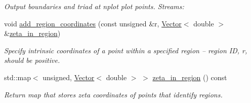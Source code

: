 \begin{DoxyCompactItemize}
\begin{DoxyCompactList}\small\item\em Output boundaries and triad at nplot plot points. Streams\+: \end{DoxyCompactList}\item 
void \hyperlink{classoomph_1_1DiskLikeGeomObjectWithBoundaries_a09b4f5e8e2a47cfb5159d4656e440359}{add\+\_\+region\+\_\+coordinates} (const unsigned \&r, \hyperlink{classoomph_1_1Vector}{Vector}$<$ double $>$ \&\hyperlink{classoomph_1_1DiskLikeGeomObjectWithBoundaries_a5573c14a4a2faeb62b4710c799397604}{zeta\+\_\+in\+\_\+region})
\begin{DoxyCompactList}\small\item\em Specify intrinsic coordinates of a point within a specified region -- region ID, r, should be positive. \end{DoxyCompactList}\item 
std\+::map$<$ unsigned, \hyperlink{classoomph_1_1Vector}{Vector}$<$ double $>$ $>$ \hyperlink{classoomph_1_1DiskLikeGeomObjectWithBoundaries_a5573c14a4a2faeb62b4710c799397604}{zeta\+\_\+in\+\_\+region} () const
\begin{DoxyCompactList}\small\item\em Return map that stores zeta coordinates of points that identify regions. \end{DoxyCompactList}\end{DoxyCompactItemize}
